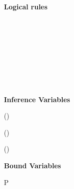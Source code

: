 \begin{figure*}[htbp]
\centering\leavevmode
{}
\par\bigskip
\begin{minipage}[t]{.3\textwidth}
\centering
\textbf{Logical rules}

\infax
  { \jsub{\Bottom}{\alpha}{\TRUE} }

\infax
  {  }
  
\infax
  { \jsub{\arrowtype{\alpha}{\rho}}{\Bottom}{\FALSE} }
  
\infax
  { \jsub{\alpha}{\Any}{\TRUE} }

\infax
  { \jsub{\Any}{\arrowtype{\alpha}{\omega}}{\FALSE} }

\infrule
  { \jsub{\alpha}{\eta}{\C} \\  }
  {  }

\infrule
  { \jsub{\alpha}{\chi}{\C} \\  \\
     }
  {  }
  
\infrule
  { \jsub{\alpha}{\eta}{\C} \\  }
  {  }
  
\infrule
  { \jsub{\alpha}{\chi}{\C} \\  }
  {  }
\end{minipage}%
\begin{minipage}[t]{.3\textwidth}
\centering
\textbf{Inference Variables}

\infrule
  { \not\in {}(\Delta) }
  {  }

\infrule
  { \not\in {}(\Delta) }
  {  }
 
\infrule
  { \not\in {}(\Delta) }
  {  }
 
\bigskip
\textbf{Bound Variables}

\infax
  {  }

\infrule
  { \bd{\dontcare} \extends P \extends \bdb{\xi} \in \Delta }
  {  }


\end{minipage}
\end{figure*}
